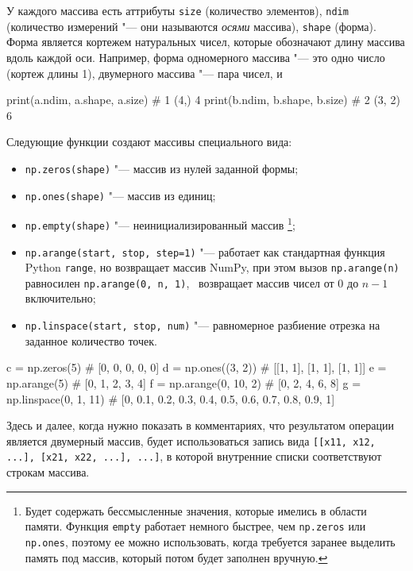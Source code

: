 У каждого массива есть аттрибуты \verb"size" (количество элементов), \verb"ndim" (количество измерений "--- они называются \emph{осями} массива), \verb"shape" (форма).
Форма является кортежем натуральных чисел, которые обозначают длину массива вдоль каждой оси.
Например, форма одномерного массива "--- это одно число (кортеж длины 1), двумерного массива "--- пара чисел, и \td
\begin{python}
print(a.ndim, a.shape, a.size)  # 1 (4,) 4 
print(b.ndim, b.shape, b.size)  # 2 (3, 2) 6
\end{python}
Следующие функции создают массивы специального вида:
\begin{itemize}
\item \verb"np.zeros(shape)" "--- массив из нулей заданной формы;
\item \verb"np.ones(shape)" "--- массив из единиц;
\item \verb"np.empty(shape)" "--- неинициализированный массив%
\footnote{Будет содержать бессмысленные значения, которые имелись в области памяти.
Функция \verb"empty" работает немного быстрее, чем \verb"np.zeros" или \verb"np.ones", поэтому ее можно использовать, когда требуется заранее выделить память под массив, который потом будет заполнен вручную.};
\item \verb"np.arange(start, stop, step=1)" "--- работает как стандартная функция Pyt\-hon \verb"range", но возвращает  массив NumPy, при этом вызов \verb"np.arange(n)" равносилен \verb"np.arange(0, n, 1)", \te\ возвращает массив чисел от 0 до $n-1$ включительно;
\item \verb"np.linspace(start, stop, num)" "--- равномерное разбиение отрезка на заданное количество точек.
\end{itemize}

\begin{python}
c = np.zeros(5)            # [0, 0, 0, 0, 0]
d = np.ones((3, 2))        # [[1, 1], [1, 1], [1, 1]]
e = np.arange(5)           # [0, 1, 2, 3, 4]
f = np.arange(0, 10, 2)    # [0, 2, 4, 6, 8]
g = np.linspace(0, 1, 11)  # [0, 0.1, 0.2, 0.3, 0.4, 0.5, 0.6, 0.7, 0.8, 0.9, 1]
\end{python}

\begin{remark}
Здесь и далее, когда нужно показать в комментариях, что результатом операции является двумерный массив, будет использоваться запись вида \verb"[[x11, x12, ...], [x21, x22, ...], ...]", в которой внутренние списки соответствуют строкам массива.
\end{remark}

